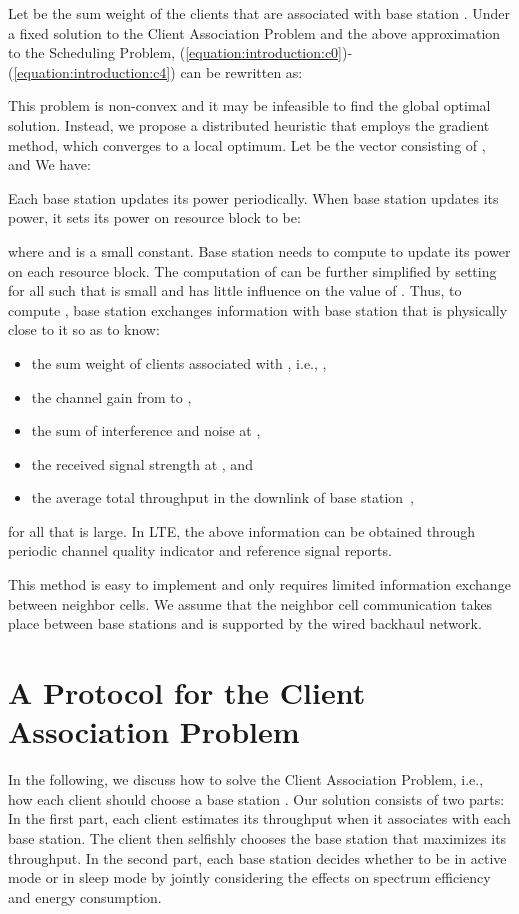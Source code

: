 \documentclass[conference]{IEEEtran}
\begin{document}
Let  be the sum weight of the clients that are associated with base station . Under a fixed solution to the Client Association Problem and the above approximation to the Scheduling Problem, (\ref{equation:introduction:c0})-(\ref{equation:introduction:c4}) can be rewritten as:


This problem is non-convex and it may be infeasible to find the global optimal solution. Instead, we propose a distributed heuristic that employs the gradient method, which converges to a local optimum\cite{Bazaraa}. Let  be the vector consisting of ,  and  We have:



Each base station updates its power periodically. When base station  updates its power, it sets its power on resource block  to be:

where  and  is a
small constant. Base station  needs to compute  to update its power on each resource block. The
computation of  can be
further simplified
by setting  for all  such that
 is small and has little influence on the value of
. Thus, to compute
,
base station  exchanges information with base station  that is physically close to it
so as to know:
\begin{itemize}
    \item the sum weight of clients associated with , i.e., ,
    \item the channel gain  from  to ,
    \item the sum of interference and noise  at ,
    \item the received signal strength  at , and
    \item the average total throughput  in the downlink of base station~,
\end{itemize}
for all  that  is large. In LTE, the above information
can be obtained through periodic channel quality indicator
and reference signal reports.


This method is easy to implement and only requires limited
information exchange between neighbor cells.
We assume that the neighbor cell
communication takes place between base stations and is supported by
the wired backhaul network.


\section{A Protocol for the Client Association Problem}
\label{section:client}

In the following, we discuss how to solve the Client Association Problem, i.e., how each client  should choose a base station . Our solution consists of two parts: In the first part, each client  estimates its throughput when it associates with each base station. The client  then selfishly chooses the base station that maximizes its throughput. In the second part, each base station decides whether to be in active mode or in sleep mode by jointly considering the effects on spectrum efficiency and energy consumption.
\end{document}
